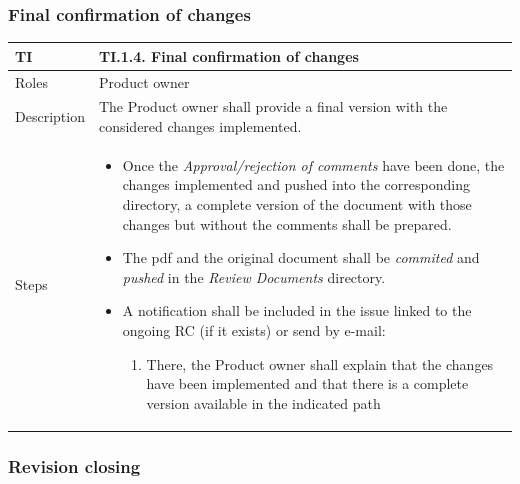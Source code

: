 \documentclass{template/openetcs_article}
\begin{document}
\subsubsection{Final confirmation of changes}

\begin{flushleft}
\tablefirsthead{}
\tablehead{}
\tabletail{}
\tablelasttail{}
\begin{supertabular}{|m{2cm}|m{13cm}|}
\hline
{}
TI & 
TI.1.4. Final confirmation of changes
\\\hline
Roles &
Product owner
\\\hline
Description &
The Product owner shall provide a final version with the considered changes implemented.  
\\\hline
Steps &
\begin{itemize}
\item Once the {\it Approval/rejection of comments} have been done, the changes implemented and pushed into the corresponding directory, a complete version of the document with those changes but without the comments shall be prepared.
\item The pdf and the original document shall be {\it commited} and {\it pushed} in the {\it Review Documents} directory.
\item A notification shall be included in the issue linked to the ongoing RC (if it exists) or send by e-mail: 
\begin{enumerate}
\item There, the Product owner shall explain that the changes have been implemented and that there is a complete version available in the indicated path
\end{enumerate}
\end{itemize}
\\\hline
\end{supertabular}
\end{flushleft}

\subsubsection{Revision closing}
\end{document}
